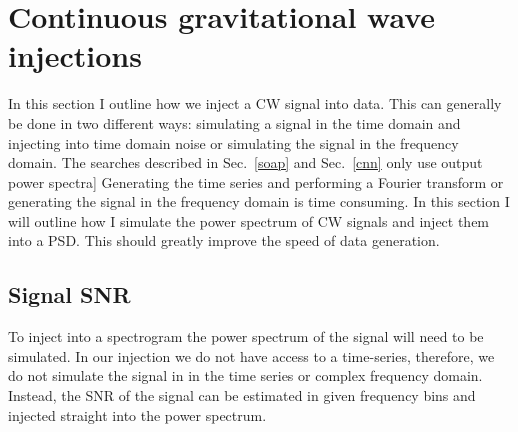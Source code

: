 \chapter{Continuous gravitational wave injections}

In this section I outline how we inject a \gls{CW} signal into data. This can generally be done in two different ways: simulating a signal in the time domain and injecting into time domain noise or simulating the signal in the frequency domain. 
The searches described in Sec.~\ref{soap} and Sec.~\ref{cnn} only use output power spectra] 
Generating the time series and performing a Fourier transform or generating the signal in the frequency domain is time consuming. 
In this section I will outline how I simulate the power spectrum of \gls{CW} signals and inject them into a \gls{PSD}.
This should greatly improve the speed of data generation.


\section{Signal SNR}

To inject into a spectrogram the power spectrum of the signal will need to be simulated. In our injection we do not have access to a time-series, therefore, we do not simulate the signal in in the time series or complex frequency domain. 
Instead, the \gls{SNR} of the signal can be estimated in given frequency bins and injected straight into the power spectrum.

